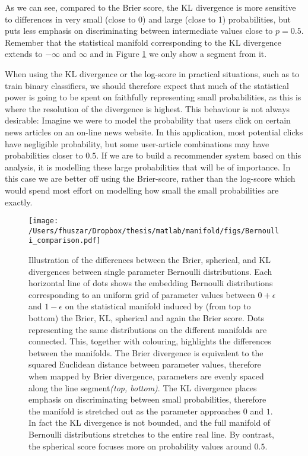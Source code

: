 As we can see, compared to the Brier score, the KL divergence is more sensitive to differences in very small (close to 0) and large (close to 1) probabilities, but puts less emphasis on discriminating between intermediate values close to $p=0.5$. Remember that the statistical manifold corresponding to the KL divergence extends to $-\infty$ and $\infty$ and in Figure \ref{fig:Bernoulli_manifold} we only show a segment from it.

When using the KL divergence or the log-score in practical situations, such as to train binary classifiers, we should therefore expect that much of the statistical power is going to be spent on faithfully representing small probabilities, as this is where the resolution of the divergence is highest. This behaviour is not always desirable: Imagine we were to model the probability that users click on certain news articles on an on-line news website. In this application, most potential clicks have negligible probability, but some user-article combinations may have probabilities closer to $0.5$. If we are to build a recommender system based on this analysis, it is modelling these large probabilities that will be of importance. In this case we are better off using the Brier-score, rather than the log-score which would spend most effort on modelling how small the small probabilities are exactly.

\begin{figure}
	\begin{center}
	 \texttt{[image: /Users/fhuszar/Dropbox/thesis/matlab/manifold/figs/Bernoulli\_comparison.pdf]}
	\end{center}
	\caption[Brier, spherical and logarithmic scoring of Bernoulli distributions]{Illustration of the differences between the Brier, spherical, and KL divergences between single parameter Bernoulli distributions. Each horizontal line of dots shows the embedding Bernoulli distributions corresponding to an uniform grid of parameter values between $0+\epsilon$ and $1-\epsilon$ on the statistical manifold induced by (from top to bottom) the Brier, KL, spherical and again the Brier score.  Dots representing the same distributions on the different manifolds are connected. This, together with colouring, highlights the differences between the manifolds.
	The Brier divergence is equivalent to the squared Euclidean distance between parameter values, therefore when mapped by Brier divergence, parameters are evenly spaced along the line segment\emph{(top, bottom)}. The KL divergence places emphasis on discriminating between  small probabilities, therefore the manifold is stretched out as the parameter approaches $0$ and $1$. In fact the KL divergence is not bounded, and the full manifold of Bernoulli distributions stretches to the entire real line. By contrast, the spherical score focuses more on probability values around $0.5$.}
	\label{fig:Bernoulli_manifold}
\end{figure}

